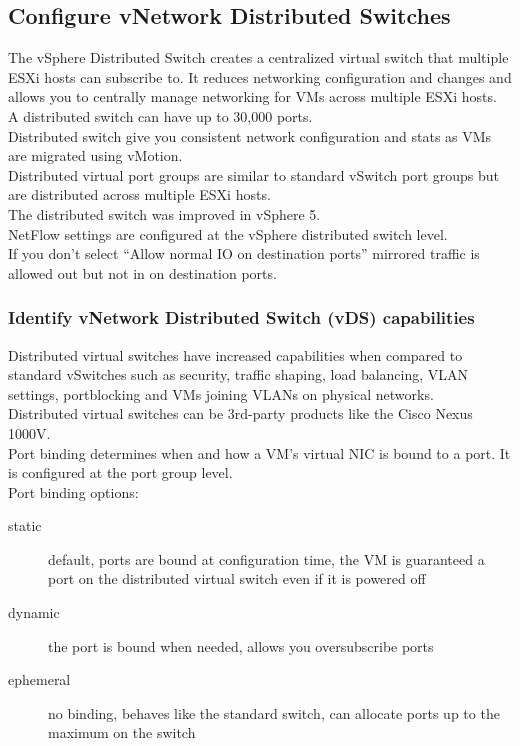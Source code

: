 \subsection{Configure vNetwork Distributed Switches}

The vSphere Distributed Switch creates a centralized virtual switch that
multiple ESXi hosts can subscribe to. It reduces networking configuration and
changes and allows you to centrally manage networking for VMs across multiple
ESXi hosts.\\

A distributed switch can have up to 30,000 ports.\\

Distributed switch give you consistent network configuration and stats as
VMs are migrated using vMotion.\\

Distributed virtual port groups are similar to standard vSwitch port groups
but are distributed across multiple ESXi hosts.\\

The distributed switch was improved in vSphere 5.\\

NetFlow settings are configured at the vSphere distributed switch level.\\

If you don't select ``Allow normal IO on destination ports'' mirrored traffic
is allowed out but not in on destination ports.

\subsubsection{Identify vNetwork Distributed Switch (vDS) capabilities}

Distributed virtual switches have increased capabilities when compared to
standard vSwitches such as security, traffic shaping, load balancing, VLAN
settings, portblocking and VMs joining VLANs on physical networks.\\

Distributed virtual switches can be 3rd-party products like the Cisco Nexus
1000V.\\

Port binding determines when and how a VM's virtual NIC is bound to a port.
It is configured at the port group level.\\

Port binding options:

\begin{description}

\item[static]
default, ports are bound at configuration time, the VM is guaranteed a port
on the distributed virtual switch even if it is powered off

\item[dynamic]
the port is bound when needed, allows you oversubscribe ports

\item[ephemeral]
no binding, behaves like the standard switch, can allocate ports up to the
maximum on the switch

\end{description}


